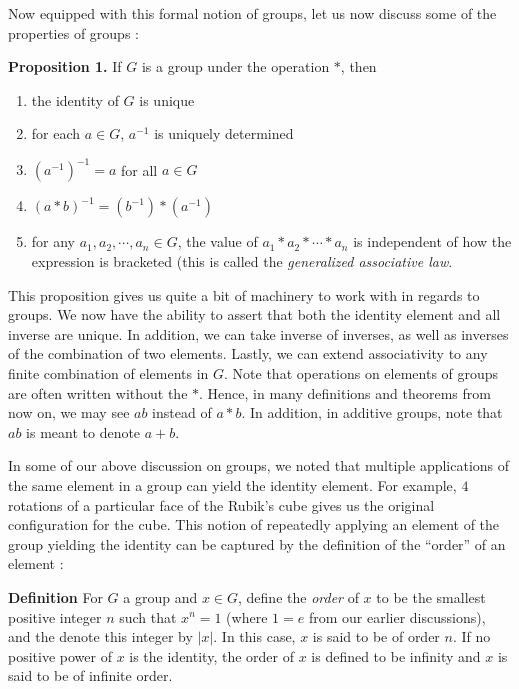 \documentclass[11pt, reqno]{amsart}
\theoremstyle{plain}
\theoremstyle{definition}
\theoremstyle{example}
\begin{document}
\par
Now equipped with this formal notion of groups, let us now discuss some of the properties of groups \cite[\S 1.1, p. 18]{dummit}:

\par
\textbf{Proposition 1.} If $G$ is a group under the operation $*$, then
\begin{enumerate}
\item the identity of $G$ is unique
\item for each $a \in G$, $a^{-1}$ is uniquely determined
\item $(a^{-1})^{-1} = a$ for all $a \in G$
\item $(a * b)^{-1} = (b^{-1}) * (a^{-1})$
\item for any $a_1, a_2, \cdots, a_n \in G$, the value of $a_1 * a_2 * \cdots * a_n$ is independent of how the expression is bracketed (this is called the \textit{generalized associative law}.
\end{enumerate}

\par
This proposition gives us quite a bit of machinery to work with in regards to groups. We now have the ability to assert that both the identity element and all inverse are unique. In addition, we can take inverse of inverses, as well as inverses of the combination of two elements. Lastly, we can extend associativity to any finite combination of elements in $G$. Note that operations on elements of groups are often written without the $*$. Hence, in many definitions and theorems from now on, we may see $ab$ instead of $a * b$. In addition, in additive groups, note that $ab$ is meant to denote $a + b$.

\par
In some of our above discussion on groups, we noted that multiple applications of the same element in a group can yield the identity element. For example, $4$ rotations of a particular face of the Rubik's cube gives us the original configuration for the cube. This notion of repeatedly applying an element of the group yielding the identity can be captured by the definition of the ``order'' of an element \cite[\S 1.1, p. 20]{dummit}:

\par
\textbf{Definition} For $G$ a group and $x \in G$, define the \textit{order} of $x$ to be the smallest positive integer $n$ such that $x^n = 1$ (where $1 = e$ from our earlier discussions), and the denote this integer by $|x|$. In this case, $x$ is said to be of order $n$. If no positive power of $x$ is the identity, the order of $x$ is defined to be infinity and $x$ is said to be of infinite order.
\end{document}
